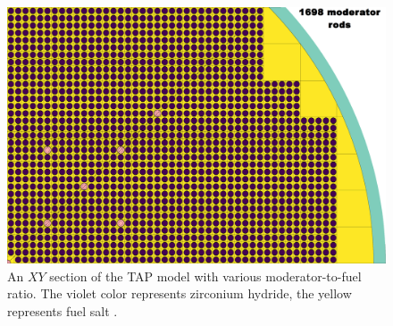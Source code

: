\begin{frame}
\begin{textblock*}{12.6cm}
\begin{figure}[htp!]
\begin{overprint}
		\centerline{\includegraphics[height=0.75\textheight]{./images/1668.png}}
	\end{overprint}
	\caption{An $XY$ section of the \gls{TAP} model with various 
	moderator-to-fuel ratio. The violet color represents zirconium hydride, 
	the yellow represents fuel salt \cite{chaube_tap_2019, 
	rykhlevskii_milestone_2019}.}
\end{figure}
\end{textblock*}
\end{frame}




